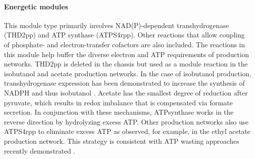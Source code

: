 \paragraph{Energetic modules}
This module type primarily involves NAD(P)-dependent transhydrogenase (THD2pp) and ATP synthase (ATPS4rpp). Other reactions that allow coupling of phosphate- and electron-transfer cofactors are also included. The reactions in this module help buffer the diverse electron and ATP requirements of production networks. THD2pp is deleted in the chassis but used as a module reaction in the isobutanol and acetate production networks.
In the case of isobutanol production, transhydrogenase expression has been demonstrated to increase the synthesis of NADPH and thus isobutanol \citep{shi2013}.
Acetate has the smallest degree of reduction after pyruvate, which results in redox imbalance that is compensated via formate secretion. In conjunction with these mechanisms, ATPsynthase works in the reverse direction by hydrolyzing excess ATP. Other production networks also use ATPS4rpp to eliminate excess ATP as observed, for example, in the ethyl acetate production network. This strategy is consistent with ATP wasting approaches recently demonstrated \citep{hadicke2015}.

